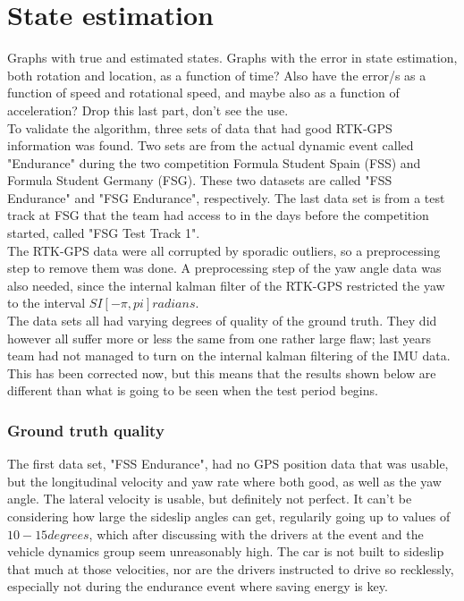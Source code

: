 \section{State estimation}

Graphs with true and estimated states. Graphs with the error in state estimation, both rotation and location, as a function of time? Also have the error/s as a function of speed and rotational speed, and maybe also as a function of acceleration? Drop this last part, don't see the use. \\ 

To validate the algorithm, three sets of data that had good RTK-GPS information was found. Two sets are from the actual dynamic event called "Endurance" during the two competition Formula Student Spain (FSS) and Formula Student Germany (FSG). These two datasets are called "FSS Endurance" and "FSG Endurance", respectively. The last data set is from a test track at FSG that the team had access to in the days before the competition started, called "FSG Test Track 1". \\

The RTK-GPS data were all corrupted by sporadic outliers, so a preprocessing step to remove them was done. A preprocessing step of the yaw angle data was also needed, since the internal kalman filter of the RTK-GPS restricted the yaw to the interval $SI{[-\pi,pi]}{radians}$. \\

The data sets all had varying degrees of quality of the ground truth. They did however all suffer more or less the same from one rather large flaw; last years team had not managed to turn on the internal kalman filtering of the IMU data. This has been corrected now, but this means that the results shown below are different than what is going to be seen when the test period begins. \\

\subsubsection{Ground truth quality}

The first data set, "FSS Endurance", had no GPS position data that was usable, but the longitudinal velocity and yaw rate where both good, as well as the yaw angle. The lateral velocity is usable, but definitely not perfect. It can't be considering how large the sideslip angles can get, regularily going up to values of $10-15 degrees$, which after discussing with the drivers at the event and the vehicle dynamics group seem unreasonably high. The car is not built to sideslip that much at those velocities, nor are the drivers instructed to drive so recklessly, especially not during the endurance event where saving energy is key. \\

